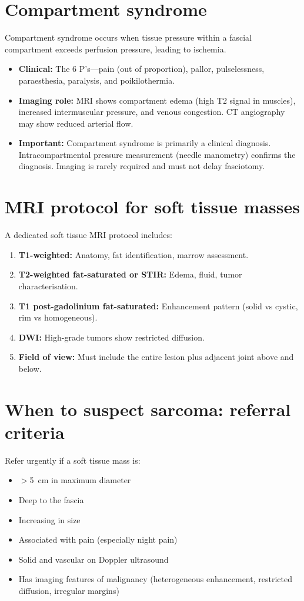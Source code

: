 \section{Compartment syndrome}
Compartment syndrome occurs when tissue pressure within a fascial compartment exceeds perfusion pressure, leading to ischemia.
\begin{itemize}
    \item \textbf{Clinical:} The 6 P's---pain (out of proportion), pallor, pulselessness, paraesthesia, paralysis, and poikilothermia.
    \item \textbf{Imaging role:} MRI shows compartment edema (high T2 signal in muscles), increased intermuscular pressure, and venous congestion. CT angiography may show reduced arterial flow.
    \item \textbf{Important:} Compartment syndrome is primarily a clinical diagnosis. Intracompartmental pressure measurement (needle manometry) confirms the diagnosis. Imaging is rarely required and must not delay fasciotomy.
\end{itemize}

\section{MRI protocol for soft tissue masses}
A dedicated soft tissue MRI protocol includes:
\begin{enumerate}
    \item \textbf{T1-weighted:} Anatomy, fat identification, marrow assessment.
    \item \textbf{T2-weighted fat-saturated or STIR:} Edema, fluid, tumor characterisation.
    \item \textbf{T1 post-gadolinium fat-saturated:} Enhancement pattern (solid vs cystic, rim vs homogeneous).
    \item \textbf{DWI:} High-grade tumors show restricted diffusion.
    \item \textbf{Field of view:} Must include the entire lesion plus adjacent joint above and below.
\end{enumerate}

\section{When to suspect sarcoma: referral criteria}
Refer urgently if a soft tissue mass is:
\begin{itemize}
    \item $>$5~cm in maximum diameter
    \item Deep to the fascia
    \item Increasing in size
    \item Associated with pain (especially night pain)
    \item Solid and vascular on Doppler ultrasound
    \item Has imaging features of malignancy (heterogeneous enhancement, restricted diffusion, irregular margins)
\end{itemize}

